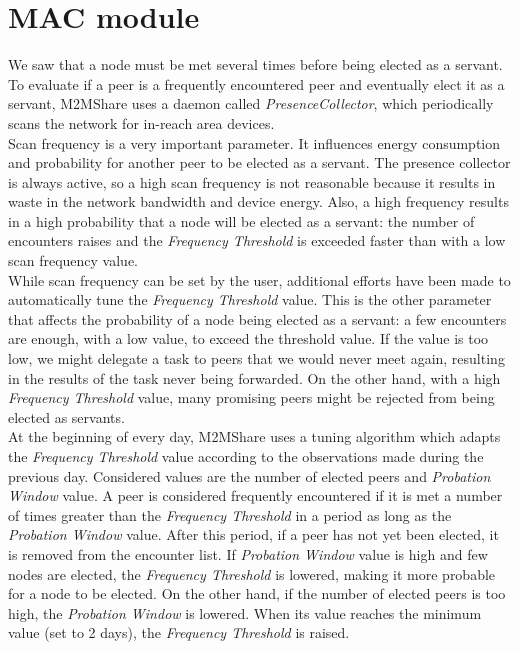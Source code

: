 \section{MAC module}
\label{descrPresenceCollector}
We saw that a node must be met several times before being elected as a servant. To evaluate if a peer is a frequently encountered peer and eventually elect it as a servant, M2MShare uses a daemon called \textit{PresenceCollector}, which periodically scans the network for in-reach area devices. 
\\

Scan frequency is a very important parameter. It influences energy consumption and probability for another peer to be elected as a servant. The presence collector is always active, so a high scan frequency is not reasonable because it results in waste in the network bandwidth and device energy. Also, a high frequency results in a high probability that a node will be elected as a servant: the number of encounters raises and the \textit{Frequency Threshold} is exceeded faster than with a low scan frequency value.
\\

While scan frequency can be set by the user, additional efforts have been made to automatically tune the \textit{Frequency Threshold} value. This is the other parameter that affects the probability of a node being elected as a servant: a few encounters are enough, with a low value, to exceed the threshold value. If the value is too low, we might delegate a task to peers that we would never meet again, resulting in the results of the task never being forwarded. On the other hand, with a high \textit{Frequency Threshold} value, many promising peers might be rejected from being elected as servants.
\\

At the beginning of every day, M2MShare uses a tuning algorithm which adapts the \textit{Frequency Threshold} value according to the observations made during the previous day. Considered values are the number of elected peers and \textit{Probation Window} value. A peer is considered frequently encountered if it is met a number of times greater than the \textit{Frequency Threshold} in a period as long as the \textit{Probation Window} value. After this period, if a peer has not yet been elected, it is removed from the encounter list. If \textit{Probation Window} value is high and few nodes are elected, the  \textit{Frequency Threshold} is lowered, making it more probable for a node to be elected. On the other hand, if the number of elected peers is too high, the \textit{Probation Window} is lowered. When its value reaches the minimum value (set to 2 days), the \textit{Frequency Threshold} is raised.


